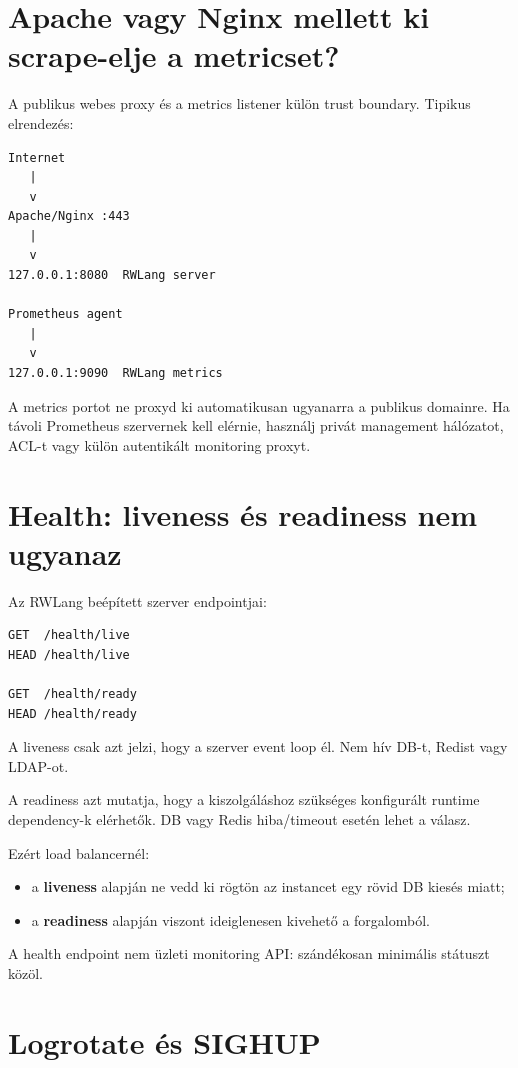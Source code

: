 \Needspace{0.42\textheight}
\section{Apache vagy Nginx mellett ki scrape-elje a metricset?}

A publikus webes proxy és a metrics listener külön trust boundary. Tipikus elrendezés:

\begin{lstlisting}
Internet
   |
   v
Apache/Nginx :443
   |
   v
127.0.0.1:8080  RWLang server

Prometheus agent
   |
   v
127.0.0.1:9090  RWLang metrics
\end{lstlisting}

A metrics portot ne proxyd ki automatikusan ugyanarra a publikus domainre. Ha távoli Prometheus szervernek kell elérnie, használj privát management hálózatot, ACL-t vagy külön autentikált monitoring proxyt.

\section{Health: liveness és readiness nem ugyanaz}

Az RWLang beépített szerver endpointjai:

\begin{lstlisting}
GET  /health/live
HEAD /health/live

GET  /health/ready
HEAD /health/ready
\end{lstlisting}

A liveness csak azt jelzi, hogy a szerver event loop él. Nem hív DB-t, Redist vagy LDAP-ot.

A readiness azt mutatja, hogy a kiszolgáláshoz szükséges konfigurált runtime dependency-k elérhetők. DB vagy Redis hiba/timeout esetén  lehet a válasz.

Ezért load balancernél:

\begin{itemize}
  \item a \textbf{liveness} alapján ne vedd ki rögtön az instancet egy rövid DB kiesés miatt;
  \item a \textbf{readiness} alapján viszont ideiglenesen kivehető a forgalomból.
\end{itemize}

A health endpoint nem üzleti monitoring API: szándékosan minimális státuszt közöl.

\Needspace{0.46\textheight}
\section{Logrotate és SIGHUP}

